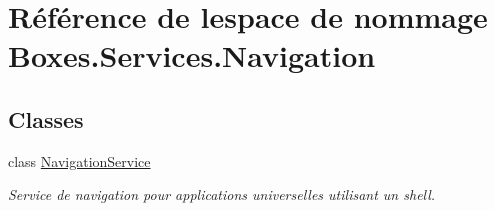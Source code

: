 \hypertarget{namespace_boxes_1_1_services_1_1_navigation}{}\section{Référence de l\textquotesingle{}espace de nommage Boxes.\+Services.\+Navigation}
\label{namespace_boxes_1_1_services_1_1_navigation}
\subsection*{Classes}
\begin{DoxyCompactItemize}
\item 
class \hyperlink{class_boxes_1_1_services_1_1_navigation_1_1_navigation_service}{Navigation\+Service}
\begin{DoxyCompactList}\small\item\em Service de navigation pour applications universelles utilisant un shell. \end{DoxyCompactList}\end{DoxyCompactItemize}
